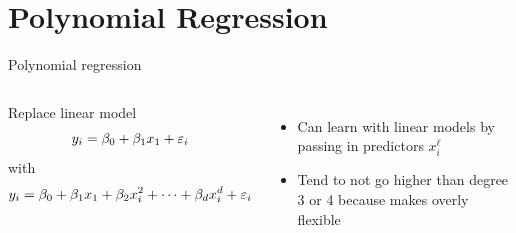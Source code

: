 \documentclass[aspectratio=169,usenames,dvipsnames]{beamer}
\newcommand{\InstructorList}[1]{
\begin{itemize}
	\color{orange}
	#1
\end{itemize}
}
\begin{document}
\section{Polynomial Regression}

\begin{frame}[c]{Polynomial regression}

\begin{columns}
\centering
Replace linear model
\begin{equation*}
	y_i = \beta_0 + \beta_1x_1 + \varepsilon_i
\end{equation*}
with
\begin{equation*}
	y_i = \beta_0 + \beta_1x_1 + \beta_2x_i^2 + \cdots + \beta_dx_i^d + \varepsilon_i
\end{equation*}

\centering
\InstructorList{
  \item Can learn with linear models by passing in predictors $x_i^\ell$
	\item Tend to not go higher than degree 3 or 4 because makes overly flexible
}

\end{columns}

\end{frame}
\end{document}
